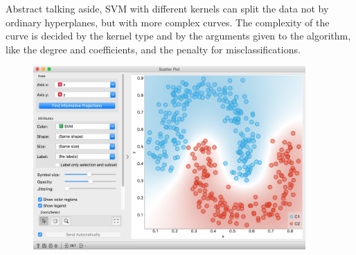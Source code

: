 Abstract talking aside, SVM with different kernels can split the data not by ordinary hyperplanes, but with more complex curves. The complexity of the curve is decided by the kernel type and by the arguments given to the algorithm, like the degree and coefficients, and the penalty for misclassifications.

\begin{figure}[h]
    \centering
    \includegraphics[height=70mm]{svm-orange.png}
    \caption{$\;$}
\end{figure}
